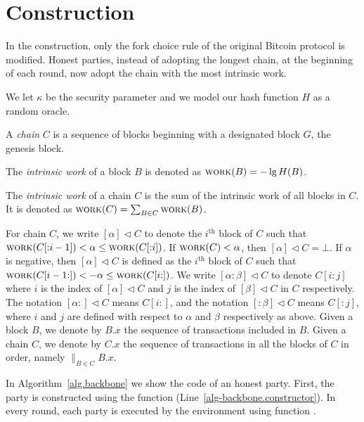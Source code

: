 \section{Construction}
In the \poem construction, only the fork choice rule
of the original Bitcoin protocol is modified.
Honest parties, instead of adopting the longest chain, at the beginning
of each round, now adopt the chain with the most intrinsic work.

We let $\kappa$ be the security parameter and we
model our hash function $H$ as a random oracle.

A \emph{chain} $C$ is a sequence of blocks beginning with a designated
block $G$, the genesis block.

\begin{definition}
  The \emph{intrinsic work} of a block
  $B$ is denoted as $\textsc{work}(B) = -\lg H(B)$.
\end{definition}

\begin{definition}
  The \emph{intrinsic work} of a chain
  $C$ is the sum of the
  intrinsic work of all blocks in $C$.
  It is denoted as $\textsc{work}(C) = \sum_{B \in C}{\textsc{work}(B)}$.
\end{definition}

\noindent
{}
For chain $C$, we write $[\alpha] \lhd C$
to denote the $i^\text{th}$ block of $C$ such that
$\textsc{work}(C[{:}{i - 1}]) < \alpha \leq \textsc{work}(C[{:}{i}])$.
If $\textsc{work}(C) < \alpha$, then $[\alpha] \lhd C = \bot$.
If $\alpha$ is negative, then $[\alpha] \lhd C$ is defined as
the $i^\text{th}$ block of $C$ such that
$\textsc{work}(C[{i - 1}{:}]) < -\alpha \leq \textsc{work}(C[{i}{:}])$.
We write $[{\alpha}{:}{\beta}] \lhd C$ to denote
$C[{i}{:}{j}]$ where $i$ is the index of $[\alpha] \lhd C$
and $j$ is the index of $[\beta] \lhd C$ in $C$ respectively.
The notation $[{\alpha}{:}] \lhd C$ means $C[{i}{:}]$,
and the notation $[{:}\beta] \lhd C$ means $C[{:}{j}]$,
where $i$ and $j$ are defined with respect to $\alpha$ and $\beta$
respectively as above.
Given a block $B$, we denote by $B.x$ the sequence of transactions
included in $B$.
Given a chain $C$, we denote by $C.x$
the sequence of transactions in all the blocks of $C$ in order, namely
${\big\lVert}_{B \in C} B.x$.

In Algorithm~\ref{alg.backbone} we show the code of an honest party.
First, the party is constructed using the \constructor function (Line~\ref{alg-backbone.constructor}).
In every round, each party is executed by the environment using function \execute.

